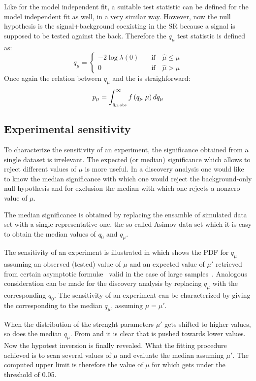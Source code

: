 Like for the model independent fit, a suitable test statistic can be defined for the model independent fit as well, in a very similar way. However, now the null hypothesis is the signal+background coexisting in the SR because a signal is supposed to be tested against the back. Therefore the $q_\mu$ test statistic is defined as:
\begin{equation}
q_\mu=
\left\{
\begin{aligned}
-2\log{\lambda(0)}\quad &\text{if}\quad \hat{\mu}\le\mu\\
 0 \qquad&\text{if}\quad \hat{\mu}>\mu
\end{aligned}
\right.
\end{equation} 
Once again the relation between $q_\mu$ and the \p is straighforward:
\begin{equation}
 p_{\mu}=\int_{q_{\mu,\textup{obs}}}^\infty f\left(q_\mu \vert \mu\right) dq_\mu
 \label{eqn:pdaqmu}
\end{equation}

\subsection{Experimental sensitivity}
\label{sec:sensitivity}
To characterize the sensitivity of an experiment, the significance obtained from a single dataset is irrelevant. The expected (or median) significance which allows to reject different values of $\mu$ is more useful. In a discovery analysis one would like to know the median significance with which one would reject the background-only null hypothesis and for exclusion the median with which one rejects a nonzero value of $\mu$.

The median significance is obtained by replacing the ensamble of simulated data set with a single representative one, the so-called Asimov data set which it is easy to obtain the median values of $q_0$ and $q_\mu$.

The sensitivity of an experiment is illustrated in \Fig{\ref{fig:medianq}} which shows the PDF for $q_\mu$ assuming an observed (tested) value of $\mu$ and an expected value of $\mu'$ retrieved from certain asymptotic formul\ae~ valid in the case of large samples~\cite{Cowan}. Analogous consideration can be made for the discovery analysis by replacing $q_\mu$ with the corresponding $q_0$. The sensitivity of an experiment can be characterized by giving the \p corresponding to the median $q_\mu$, assuming $\mu=\mu'$. 

When the distribution of the strenght parameters $\mu'$ gets shifted to higher values, so does the median $q_\mu$. From \Eqn{\ref{eqn:pdaq0}} and \Eqn{\ref{eqn:pdaqmu}} it is clear that \p is pushed towards lower values. Now the hypotest inversion is finally revealed. What the fitting procedure achieved is to scan several values of $\mu$ and evaluate the median \p assuming $\mu'$. The computed upper limit is therefore the value of $\mu$ for which \p gets under the threshold of \num{0.05}.


